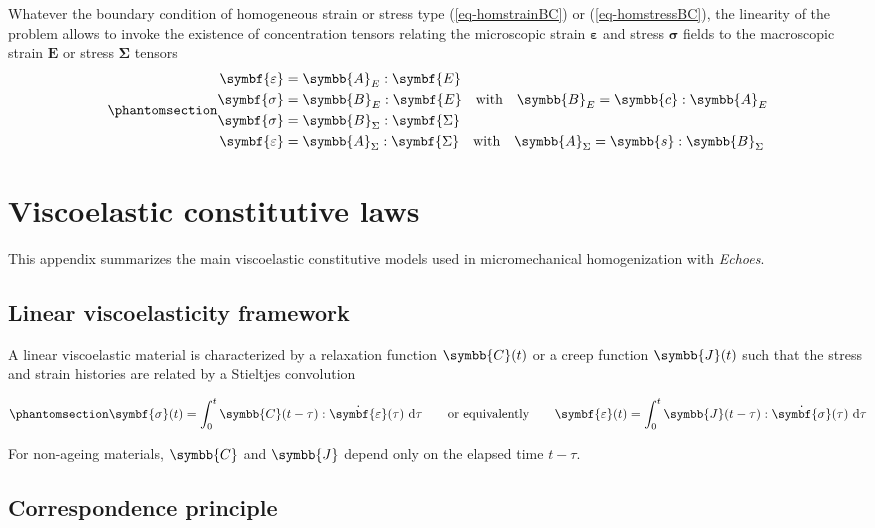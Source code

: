 \documentclass[
  a4paper,
  numbers=noendperiod,
  DIV=12]{scrreprt}
\newcommand{\uu}[1]{{\symbf{{#1}}}}
\newcommand{\uuuu}[1]{{\symbb{{#1}}}}
\newcommand{\eps}{{\uu{{\varepsilon}}}}
\newcommand{\E}{{\uu{{E}}}}
\newcommand{\sig}{{\uu{{\sigma}}}}
\newcommand{\Sig}{{\uu{{\Sigma}}}}
\newcommand{\ud}{{\,\mathrm{d}}}
\begin{document}
Whatever the boundary condition of homogeneous strain or stress type
(\ref{eq-homstrainBC}) or (\ref{eq-homstressBC}), the linearity of the
problem allows to invoke the existence of concentration tensors relating
the microscopic strain \(\eps\) and stress \(\sig\) fields to the
macroscopic strain \(\E\) or stress \(\Sig\) tensors
\begin{equation}\protect\phantomsection\label{eq-conc}{\begin{align}
\eps & =  \uuuu{A}_E:\E \\
\sig & =  \uuuu{B}_E:\E \quad\textrm{with}\quad \uuuu{B}_E=\uuuu{c}:\uuuu{A}_E \\
\sig & =  \uuuu{B}_\Sigma:\Sig \\
\eps & =  \uuuu{A}_\Sigma:\Sig \quad\textrm{with}\quad \uuuu{A}_\Sigma=\uuuu{s}:\uuuu{B}_\Sigma 
\end{align}}\end{equation}

\chapter{Viscoelastic constitutive laws}\label{sec-viscoelastic-laws}

This appendix summarizes the main viscoelastic constitutive models used
in micromechanical homogenization with \emph{Echoes}.

\section{Linear viscoelasticity
framework}\label{linear-viscoelasticity-framework}

A linear viscoelastic material is characterized by a relaxation function
\(\uuuu{C}(t)\) or a creep function \(\uuuu{J}(t)\) such that the stress
and strain histories are related by a Stieltjes convolution

\begin{equation}\protect\phantomsection\label{eq-stieltjes}{
\sig(t) = \int_0^t \uuuu{C}(t-\tau) : \dot{\eps}(\tau) \, \ud\tau
\qquad\text{or equivalently}\qquad
\eps(t) = \int_0^t \uuuu{J}(t-\tau) : \dot{\sig}(\tau) \, \ud\tau
}\end{equation}

For non-ageing materials, \(\uuuu{C}\) and \(\uuuu{J}\) depend only on
the elapsed time \(t-\tau\).

\section{Correspondence principle}\label{sec-correspondence}
\end{document}
